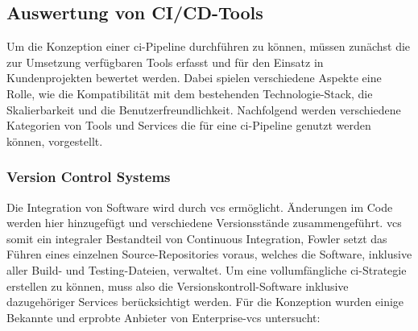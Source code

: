\subsection{Auswertung von CI/CD-Tools} \label{subsec:03-concept-2}

Um die Konzeption einer \acrshort{ci}-Pipeline durchführen zu können, müssen zunächst die zur Umsetzung verfügbaren
Tools erfasst und für den Einsatz in Kundenprojekten bewertet werden.
Dabei spielen verschiedene Aspekte eine Rolle, wie die Kompatibilität mit dem bestehenden Technologie-Stack, die
Skalierbarkeit und die Benutzerfreundlichkeit.
Nachfolgend werden verschiedene Kategorien von Tools und Services die für eine \acrshort{ci}-Pipeline genutzt werden
können, vorgestellt.

\subsubsection{Version Control Systems}

Die Integration von Software wird durch \acrshort{vcs} ermöglicht.
Änderungen im Code werden hier hinzugefügt und verschiedene Versionsstände zusammengeführt.
\acrshort{vcs} somit ein integraler Bestandteil von Continuous Integration, Fowler setzt das Führen eines einzelnen
Source-Repositories voraus, welches die Software, inklusive aller Build- und Testing-Dateien, verwaltet.
Um eine vollumfängliche \acrshort{ci}-Strategie erstellen zu können, muss also die Versionskontroll-Software
inklusive dazugehöriger Services berücksichtigt werden.
Für die Konzeption wurden einige Bekannte und erprobte Anbieter von Enterprise-\acrshort{vcs} untersucht:

